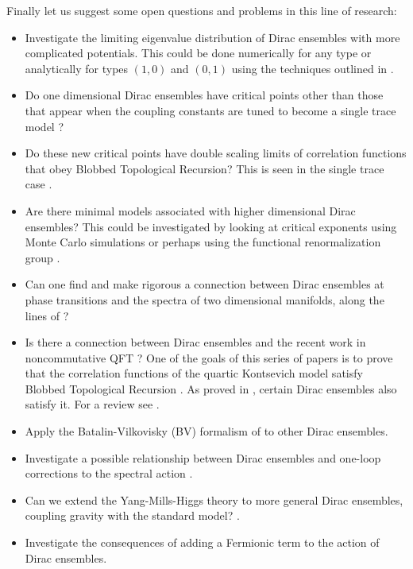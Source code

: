 \documentclass[10pt]{article}
\begin{document}
Finally let us suggest some open questions and problems in this line of research:
\begin{itemize}
		\item Investigate the limiting eigenvalue distribution of Dirac ensembles with more complicated potentials. This could be done numerically for any type or analytically for types $(1,0)$ and $(0,1)$ using the techniques outlined in \cite{First paper}.
	\item Do one dimensional Dirac ensembles have critical points other than those that appear when the coupling constants are tuned to become a single trace model \cite{HKP 2}?
	\item Do these new critical points have  double scaling limits of correlation functions that obey Blobbed Topological Recursion? This is seen in the single trace case \cite{Eynard2018}.
	\item Are there minimal models associated with higher dimensional Dirac ensembles? This could be investigated by looking at critical exponents using Monte Carlo simulations \cite{glaser} or perhaps using the functional renormalization group \cite{Sanchez2}.
	\item Can one find and make rigorous a connection between Dirac ensembles at phase transitions and the spectra of two dimensional manifolds, along the lines of \cite{Spectral estimators}?
	\item Is there a connection between Dirac ensembles and the recent work in noncommutative QFT \cite{Quartic K 1,Quartic K 2,Quart K 3,Quartic K 4}? One of the goals of this series of papers is  to prove that the correlation functions of the quartic Kontsevich model satisfy Blobbed Topological Recursion \cite{blobbed1}. As proved in \cite{AK}, certain Dirac ensembles also satisfy it. For a review see \cite{Quartic K review}.
	\item Apply the Batalin-Vilkovisky (BV) formalism of  \cite{BV nottingham} to  other Dirac ensembles.
	
	\item Investigate a possible relationship between Dirac ensembles and one-loop corrections to the spectral action  \cite{one loop}.
	
	\item Can we extend the Yang-Mills-Higgs theory to more general Dirac ensembles, coupling gravity with the standard model?  \cite{Sanchez3}.
	
	\item Investigate the consequences of adding a Fermionic term to the action of Dirac ensembles. 
	\end{itemize}
\end{document}
